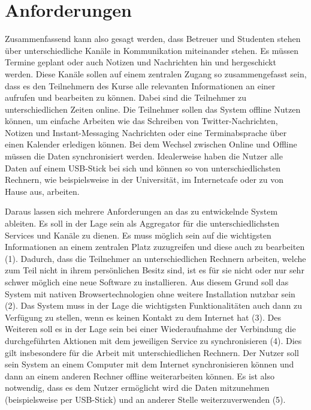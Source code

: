 \section{Anforderungen}\label{section:anforderungen_summary}
Zusammenfassend kann also gesagt werden, dass Betreuer und Studenten stehen über unterschiedliche Kanäle in Kommunikation miteinander stehen. Es müssen Termine geplant oder auch Notizen und Nachrichten hin und hergeschickt werden. Diese Kanäle sollen auf einem zentralen Zugang so zusammengefasst sein, dass es den Teilnehmern des Kurse alle relevanten Informationen an einer aufrufen und bearbeiten zu können. Dabei sind die Teilnehmer zu unterschiedlichen Zeiten online. Die Teilnehmer sollen das System offline Nutzen können, um einfache Arbeiten wie das Schreiben von Twitter-Nachrichten, Notizen und Instant-Messaging Nachrichten oder eine Terminabsprache über einen Kalender erledigen können. Bei dem Wechsel zwischen Online und Offline müssen die Daten synchronisiert werden. Idealerweise haben die Nutzer alle Daten auf einem USB-Stick bei sich und können so von unterschiedlichsten Rechnern, wie beispielsweise in der Universität, im Internetcafe oder zu von Hause aus, arbeiten.

Daraus lassen sich mehrere Anforderungen an das zu entwickelnde System ableiten. Es soll in der Lage sein als Aggregator für die unterschiedlichsten Services und Kanäle zu dienen. Es muss möglich sein auf die wichtigsten Informationen an einem zentralen Platz zuzugreifen und diese auch zu bearbeiten (1). Dadurch, dass die Teilnehmer an unterschiedlichen Rechnern arbeiten, welche zum Teil nicht in ihrem persönlichen Besitz sind, ist es für sie nicht oder nur sehr schwer möglich eine neue Software zu installieren. Aus diesem Grund soll das System mit nativen Browsertechnologien ohne weitere Installation nutzbar sein (2). Das System muss in der Lage die wichtigsten Funktionalitäten auch dann zu Verfügung zu stellen, wenn es keinen Kontakt zu dem Internet hat (3). Des Weiteren soll es in der Lage sein bei einer Wiederaufnahme der Verbindung die durchgeführten Aktionen mit dem jeweiligen Service zu synchronisieren (4). Dies gilt insbesondere für die Arbeit mit unterschiedlichen Rechnern. Der Nutzer soll sein System an einem Computer mit dem Internet synchronisieren können und dann an einem anderen Rechner offline weiterarbeiten können. Es ist also notwendig, dass es dem Nutzer ermöglicht wird die Daten mitzunehmen (beispielsweise per USB-Stick) und an anderer Stelle weiterzuverwenden (5). 

